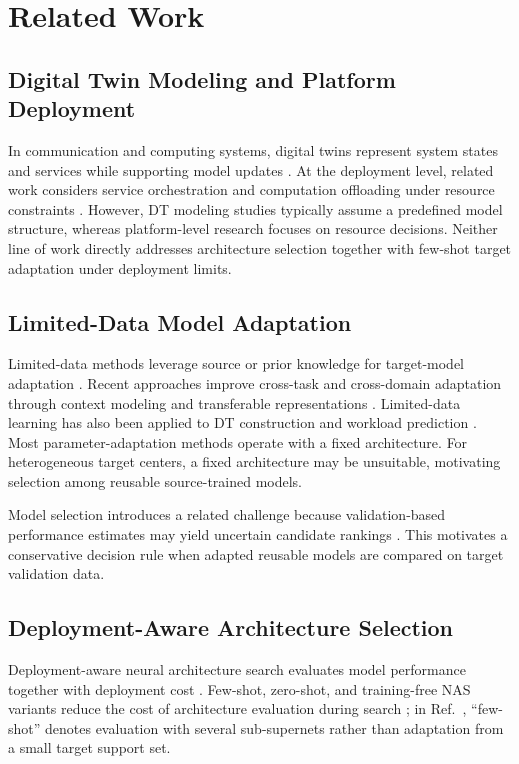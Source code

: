 \documentclass[a4paper,fleqn]{cas-sc}
\begin{document}
\section{Related Work}
\label{sec:related}

\subsection{Digital Twin Modeling and Platform Deployment}

In communication and computing systems, digital twins represent system states
and services while supporting model updates \cite{ref5,ref6,ref7,ref8}.
At the deployment level, related work considers service orchestration and
computation offloading under resource constraints \cite{ref27,ref28}.
However, DT modeling studies typically assume a predefined model structure,
whereas platform-level research focuses on resource decisions. Neither line of work directly addresses architecture selection together with
few-shot target adaptation under deployment limits.

\subsection{Limited-Data Model Adaptation}

Limited-data methods leverage source or prior knowledge for target-model
adaptation \cite{ref9,ref10,ref24}. Recent approaches improve cross-task and
cross-domain adaptation through context modeling and transferable
representations \cite{ref20,ref21,ref22,ref23}. Limited-data learning has also
been applied to DT construction and workload prediction \cite{ref11,ref25}.
Most parameter-adaptation methods operate with a fixed architecture. For
heterogeneous target centers, a fixed architecture may be unsuitable,
motivating selection among reusable source-trained models.

Model selection introduces a related challenge because validation-based
performance estimates may yield uncertain candidate rankings
\cite{ref33,ref34}. This motivates a conservative decision rule when adapted
reusable models are compared on target validation data.

\subsection{Deployment-Aware Architecture Selection}

Deployment-aware neural architecture search evaluates model performance
together with deployment cost \cite{ref12,ref13,ref26}. Few-shot, zero-shot,
and training-free NAS variants reduce the cost of architecture evaluation
during search \cite{ref14,ref15,ref16}; in Ref.~\cite{ref14}, ``few-shot''
denotes evaluation with several sub-supernets rather than adaptation from a
small target support set.
\end{document}
